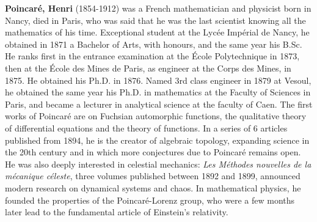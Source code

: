 \textbf{Poincaré, Henri} (1854-1912) was a French mathematician and physicist born in Nancy, died in Paris, who was said that he was the last scientist knowing all the mathematics of his time. Exceptional student at the Lycée Impérial de Nancy, he obtained in 1871 a Bachelor of Arts, with honours, and the same year his B.Sc. He ranks first in the entrance examination at the École Polytechnique in 1873, then at the École des Mines de Paris, as engineer at the Corps des Mines, in 1875. He obtained his Ph.D. in 1876. Named 3rd class engineer in 1879 at Vesoul, he obtained the same year his Ph.D. in mathematics at the Faculty of Sciences in Paris, and became a lecturer in analytical science at the faculty of Caen. The first works of Poincaré are on Fuchsian automorphic functions, the qualitative theory of differential equations and the theory of functions. In a series of 6 articles published from 1894, he is the creator of algebraic topology, expanding science in the 20th century and in which more conjectures due to Poincaré remains open. He was also deeply interested in celestial mechanics: \textit{Les Méthodes nouvelles de la mécanique céleste}, three volumes published between 1892 and 1899, announced modern research on dynamical systems and chaos. In mathematical physics, he founded the properties of the Poincaré-Lorenz group, who were a few months later lead to the fundamental article of Einstein's relativity.

